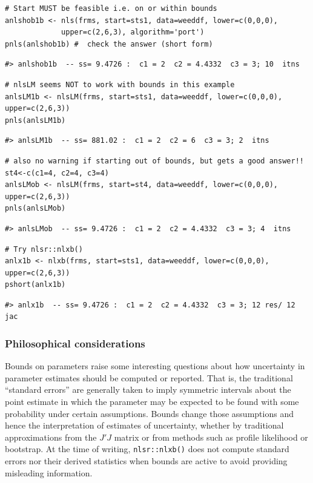\begin{verbatim}
# Start MUST be feasible i.e. on or within bounds
anlshob1b <- nls(frms, start=sts1, data=weeddf, lower=c(0,0,0),
             upper=c(2,6,3), algorithm='port')
pnls(anlshob1b) #  check the answer (short form)
\end{verbatim}

\begin{verbatim}
#> anlshob1b  -- ss= 9.4726 :  c1 = 2  c2 = 4.4332  c3 = 3; 10  itns
\end{verbatim}

\begin{verbatim}
# nlsLM seems NOT to work with bounds in this example
anlsLM1b <- nlsLM(frms, start=sts1, data=weeddf, lower=c(0,0,0), upper=c(2,6,3))
pnls(anlsLM1b)
\end{verbatim}

\begin{verbatim}
#> anlsLM1b  -- ss= 881.02 :  c1 = 2  c2 = 6  c3 = 3; 2  itns
\end{verbatim}

\begin{verbatim}
# also no warning if starting out of bounds, but gets a good answer!!
st4<-c(c1=4, c2=4, c3=4)
anlsLMob <- nlsLM(frms, start=st4, data=weeddf, lower=c(0,0,0), upper=c(2,6,3))
pnls(anlsLMob)
\end{verbatim}

\begin{verbatim}
#> anlsLMob  -- ss= 9.4726 :  c1 = 2  c2 = 4.4332  c3 = 3; 4  itns
\end{verbatim}

\begin{verbatim}
# Try nlsr::nlxb()
anlx1b <- nlxb(frms, start=sts1, data=weeddf, lower=c(0,0,0), upper=c(2,6,3))
pshort(anlx1b)
\end{verbatim}

\begin{verbatim}
#> anlx1b  -- ss= 9.4726 :  c1 = 2  c2 = 4.4332  c3 = 3; 12 res/ 12 jac
\end{verbatim}

\subsubsection{Philosophical considerations}\label{philosophical-considerations}

Bounds on parameters raise some interesting questions about how
uncertainty in parameter estimates should be computed or reported. That is, the
traditional ``standard errors'' are generally taken to imply symmetric intervals about
the point estimate in which the parameter may be expected to be found with some
probability under certain assumptions.
Bounds change those assumptions and hence the interpretation of estimates of
uncertainty, whether by traditional approximations from the \(J' J\) matrix or from methods
such as profile likelihood or bootstrap. At the time of writing,
\texttt{nlsr::nlxb()} does not compute standard errors nor their derived statistics
when bounds are active to avoid providing misleading information.

